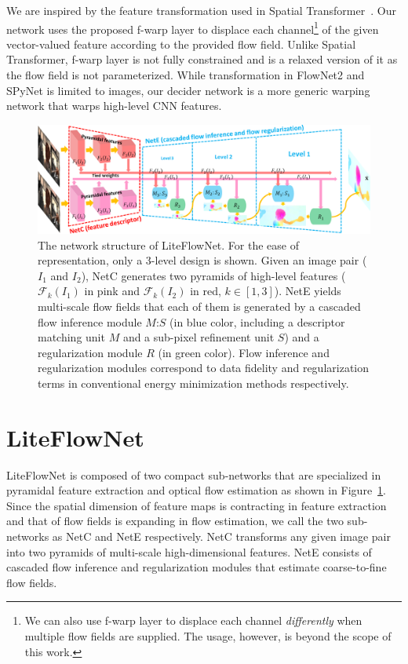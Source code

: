 \documentclass[10pt,twocolumn,letterpaper]{article}
\begin{document}
We are inspired by the feature transformation used in Spatial Transformer~\cite{Jaderberg15}. Our network uses the proposed f-warp layer to displace each channel\footnote{We can also use f-warp layer to displace each channel \textit{differently} when multiple flow fields are supplied. The usage, however, is beyond the scope of this work.} of the given vector-valued feature according to the provided flow field. Unlike Spatial Transformer, f-warp layer is not fully constrained and is a relaxed version of it as the flow field is not parameterized. While transformation in FlowNet2 and SPyNet is limited to images, our decider network is a more generic warping network that warps high-level CNN features. 
%
\begin{figure}[ht]
\centering
   \includegraphics[width=\linewidth]{figure/LiteFlowNet.png}
\caption{The network structure of LiteFlowNet. For the ease of representation, only a 3-level design is shown. Given an image pair ($I_{1}$ and $I_{2}$), NetC generates two pyramids of high-level features ($\mathcal F_{k}(I_{1})$ in pink and $\mathcal F_{k}(I_{2})$ in red, $k \in [1, 3]$). 
%
NetE yields multi-scale flow fields that each of them is generated by a cascaded flow inference module $M$:$S$ (in blue color, including a descriptor matching unit $M$ and a sub-pixel refinement unit $S$) and a regularization module $R$ (in green color). 
%
Flow inference and regularization modules correspond to data fidelity and regularization terms in conventional energy minimization methods respectively.}
\label{fig:network structure}
\end{figure}

\section{LiteFlowNet}
\label{sec:liteflownet}
%
LiteFlowNet is composed of two compact sub-networks that are specialized in pyramidal feature extraction and optical flow estimation as shown in Figure~\ref{fig:network structure}. Since the spatial dimension of feature maps is contracting in feature extraction and that of flow fields is expanding in flow estimation, we call the two sub-networks as NetC and NetE respectively. NetC transforms any given image pair into two pyramids of multi-scale high-dimensional features. NetE consists of cascaded flow inference and regularization modules that estimate coarse-to-fine flow fields. 
\end{document}
